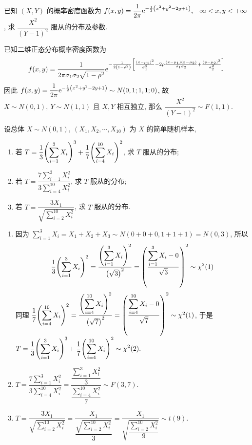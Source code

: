 \begin{example}
    已知 $(X,Y)$ 的概率密度函数为 $\displaystyle f(x,y)=\dfrac{1}{2\pi}\mathrm{e}^{-\frac{1}{2}\qty(x^2+y^2-2y+1)},-\infty<x,y<+\infty$, 求 $\dfrac{X^2}{(Y-1)^2}$ 服从的分布及参数.
\end{example}
\begin{solution}
    已知二维正态分布概率密度函数为 $$f(x,y)=\dfrac{1}{2\pi\sigma_1\sigma_2\sqrt{1-\rho^2}}\mathrm{e}^{-\frac{1}{2\qty(1-\rho^2)}\qty[\frac{(x-\mu_1)^2}{\sigma_1^2}-2\rho\frac{(x-\mu_1)(x-\mu_2)}{\sigma_1\sigma_2}+\frac{(y-\mu_2)^2}{\sigma_2^2}]}$$
    因此 $f(x,y)=\dfrac{1}{2\pi}\mathrm{e}^{-\frac{1}{2}\qty(x^2+y^2-2y+1)}\sim N(0,1;1,1;0)$, 故 $X\sim N(0,1),~Y\sim N(1,1)$ 且 $X,Y$ 相互独立, 那么 $\dfrac{X^2}{(Y-1)^2}\sim F(1,1).$
\end{solution}

\begin{example}
    设总体 $X\sim N(0,1),~(X_1,X_2,\cdots,X_{10})$ 为 $X$ 的简单随机样本, 
    \begin{enumerate}[label=(\arabic{*})]
        \item 若 $T=\displaystyle\dfrac{1}{3}\qty(\sum_{i=1}^{3}X_i)^3+\dfrac{1}{7}\qty(\sum_{i=4}^{10}X_i)^2$, 求 $T$ 服从的分布;
        \item 若 $T=\dfrac{\displaystyle7\sum_{i=1}^{3}X_i^2}{\displaystyle 3\sum_{i=4}^{10}X_i^2}$, 求 $T$ 服从的分布;
        \item 若 $T=\dfrac{3X_1}{\sqrt{\displaystyle\sum_{i=2}^{10}X_i^2}}$, 求 $T$ 服从的分布.
    \end{enumerate}
\end{example}
\begin{solution}
    \begin{enumerate}[label=(\arabic{*})]
        \item 因为 $\displaystyle\sum_{i=1}^{3}X_i=X_1+X_2+X_3\sim N(0+0+0,1+1+1)=N(0,3)$, 所以
              $$\dfrac{1}{3}\qty(\sum_{i=1}^{3}X_i)^2=\dfrac{\displaystyle\qty(\sum_{i=1}^{3}X_i)^2}{\qty(\sqrt{3})^2}=\qty(\dfrac{\displaystyle\sum_{i=1}^{3}X_i-0}{\sqrt{3}})^2\sim \chi^2(1)$$
              同理 $\dfrac{1}{7}\qty(\displaystyle\sum_{i=4}^{10}X_i)^2=\dfrac{\qty(\displaystyle\sum_{i=4}^{10}X_i)^2}{\qty(\sqrt{7})^2}=\qty(\dfrac{\displaystyle\sum_{i=4}^{10}X_i-0}{\sqrt{7}})^2\sim\chi^2(1)$, 
              于是 $T=\displaystyle\dfrac{1}{3}\qty(\sum_{i=1}^{3}X_i)^3+\dfrac{1}{7}\qty(\sum_{i=4}^{10}X_i)^2\sim\chi^2(2).$
        \item $T=\dfrac{\displaystyle7\sum_{i=1}^{3}X_i^2}{\displaystyle 3\sum_{i=4}^{10}X_i^2}=\dfrac{\dfrac{\sum_{i=1}^{3}X_i^2}{3}}{\dfrac{\sum_{i=4}^{10}X_i^2}{7}}\sim F(3,7).$
        \item $T=\dfrac{3X_1}{\sqrt{\displaystyle\sum_{i=2}^{10}X_i^2}}=\dfrac{X_1}{\dfrac{\sqrt{\sum_{i=2}^{10}X_i^2}}{3}}=\dfrac{X_1}{\sqrt{\dfrac{\sum_{i=2}^{10}X_i^2}{9}}}\sim t(9).$
    \end{enumerate}
\end{solution}
